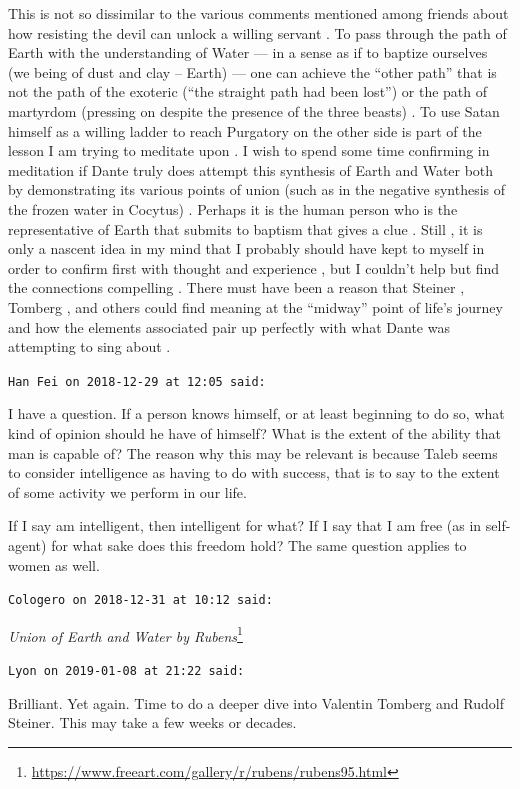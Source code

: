 \begin{footnotesize}
\begin{sffamily}
This is not so dissimilar to the various comments mentioned among friends about how resisting the devil can unlock a willing servant . To pass through the path of Earth with the understanding of Water --- in a sense as if to baptize ourselves (we being of dust and clay -- Earth) --- one can achieve the ``other path'' that is not the path of the exoteric (``the straight path had been lost'') or the path of martyrdom (pressing on despite the presence of the three beasts) . To use Satan himself as a willing ladder to reach Purgatory on the other side is part of the lesson I am trying to meditate upon . I wish to spend some time confirming in meditation if Dante truly does attempt this synthesis of Earth and Water both by demonstrating its various points of union (such as in the negative synthesis of the frozen water in Cocytus) . Perhaps it is the human person who is the representative of Earth that submits to baptism that gives a clue . Still , it is only a nascent idea in my mind that I probably should have kept to myself in order to confirm first with thought and experience , but I couldn't help but find the connections compelling . There must have been a reason that Steiner , Tomberg , and others could find meaning at the ``midway'' point of life's journey and how the elements associated pair up perfectly with what Dante was attempting to sing about .

\hfill

\texttt{Han Fei on 2018-12-29 at 12:05 said:}

I have a question. If a person knows himself, or at least beginning to do so, what kind of opinion should he have of himself? What is the extent of the ability that man is capable of? The reason why this may be relevant is because Taleb seems to consider intelligence as having to do with success, that is to say to the extent of some activity we perform in our life.

If I say am intelligent, then intelligent for what? If I say that I am free (as in self-agent) for what sake does this freedom hold? The same question applies to women as well.

\hfill

\texttt{Cologero on 2018-12-31 at 10:12 said:}

\textit{Union of Earth and Water by Rubens}\footnote{\url{https://www.freeart.com/gallery/r/rubens/rubens95.html}}

\hfill

\texttt{Lyon on 2019-01-08 at 21:22 said:}

Brilliant. Yet again. Time to do a deeper dive into Valentin Tomberg and Rudolf Steiner. This may take a few weeks or decades.

\hfill

\end{sffamily}
\end{footnotesize}

